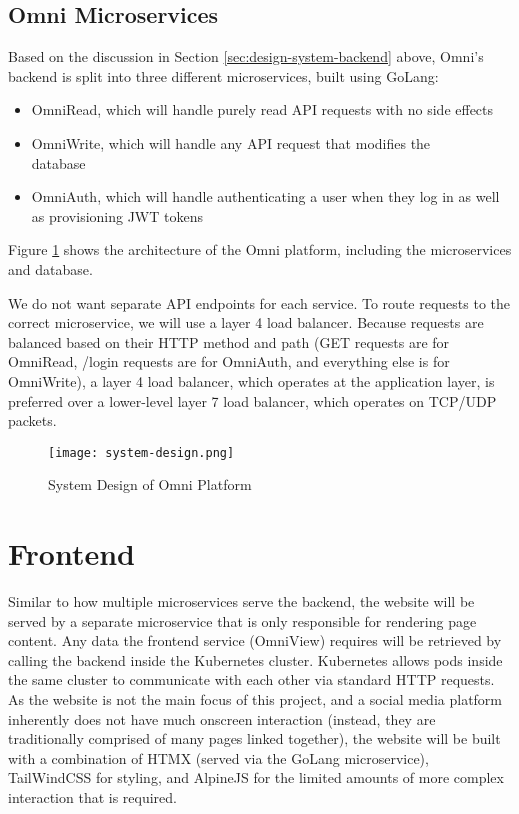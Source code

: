 \subsection{Omni Microservices}
\label{sec:design-system-backend-microservices}
Based on the discussion in Section \ref{sec:design-system-backend} above, Omni's backend is split into three different microservices, built using GoLang:
\begin{itemize}
    \item OmniRead, which will handle purely read API requests with no side effects
    \item OmniWrite, which will handle any API request that modifies the \\database
    \item OmniAuth, which will handle authenticating a user when they log in as well as provisioning JWT tokens
\end{itemize}
Figure \ref{fig:system-design} shows the architecture of the Omni platform, including the microservices and database.

We do not want separate API endpoints for each service. To route requests to the correct microservice, we will use a layer 4 load balancer. Because requests are balanced based on their HTTP method and path (GET requests are for OmniRead, /login requests are for OmniAuth, and everything else is for OmniWrite), a layer 4 load balancer, which operates at the application layer, is preferred over a lower-level layer 7 load balancer, which operates on TCP/UDP packets.

\begin{figure}[htbp]
\texttt{[image: system-design.png]}
\centering
\caption{System Design of Omni Platform}
\label{fig:system-design}
\end{figure}

\section{Frontend}
\label{sec:design-system-frontend}
Similar to how multiple microservices serve the backend, the website will be served by a separate microservice that is only responsible for rendering page content.
Any data the frontend service (OmniView) requires will be retrieved by calling the backend inside the Kubernetes cluster. Kubernetes allows pods inside the same cluster to communicate with each other via standard HTTP requests.
As the website is not the main focus of this project, and a social media platform inherently does not have much onscreen interaction (instead, they are traditionally comprised of many pages linked together), the website will be built with a combination of HTMX (served via the GoLang microservice), TailWindCSS for styling, and AlpineJS for the limited amounts of more complex interaction that is required.


